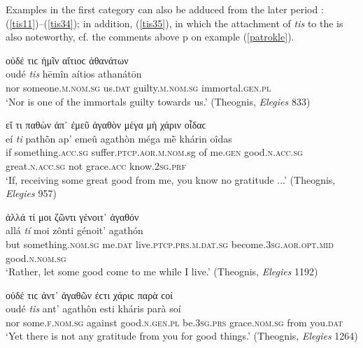 Examples in the first category can also be adduced from the later period \citep[572, note 6]{Kuehner1870}: (\ref{tis11})--(\ref{tis34}); in addition, (\ref{tis35}), in which the attachment of \textit{tis} to the  is also noteworthy, cf. the comments above p\pageref{patrokle} on example (\ref{patrokle}).

\begin{exe}
\ex οὐδέ τιϲ ἡμῖν αἴτιοϲ ἀθανάτων\\
\gll oudé \emph{tis} hēmîn aítios athanátōn\\
nor someone.\textsc{m.nom.sg} us.\textsc{dat} guilty.\textsc{m.nom.sg}
immortal.\textsc{gen.pl}\\
\trans `Nor is one of the immortals guilty towards us.' (Theognis, \textit{Elegies} 833)
\label{tis11}
\end{exe}

\begin{exe}
\ex εἴ τι παθὼν ἀπ᾽ ἐμεῦ ἀγαθὸν μέγα μὴ χάριν οἶδαϲ\\
\gll eí \emph{ti} pathṑn ap' emeû agathòn méga mḕ khárin oîdas\\
if something.\textsc{acc.sg} suffer.\textsc{ptcp.aor.m.nom.}sg of me.\textsc{gen} good.\textsc{n.acc.sg} great.\textsc{n.acc.sg} not grace.\textsc{acc} know.\textsc{2sg.prf}\\
\trans `If, receiving some great good from me, you know no gratitude ...' (Theognis, \textit{Elegies} 957)
\label{tis12}
\end{exe}

\begin{exe}
\ex ἀλλά τί μοι ζῶντι γένοιτ᾽ ἀγαθόν\\
\gll allá \emph{tí} moi zônti génoit' agathón\\
but something.\textsc{nom.sg} me.\textsc{dat} live.\textsc{ptcp.prs.m.dat.sg} become.\textsc{3sg.aor.opt.mid} good.\textsc{n.nom.sg}\\
\trans `Rather, let some good come to me while I live.' (Theognis, \textit{Elegies} 1192)
\label{tis13}
\end{exe}

\begin{exe}
\ex οὐδέ τιϲ ἀντ᾽ ἀγαθῶν ἐϲτι χάριϲ παρὰ ϲοί\\
\gll oudé \emph{tis} ant' agathôn esti kháris parà soí\\
nor some.\textsc{f.nom.sg} against good.\textsc{n.gen.pl} be.\textsc{3sg.prs} grace.\textsc{nom.sg} from you.\textsc{dat}\\
\trans `Yet there is not any gratitude from you for good things.' (Theognis, \textit{Elegies} 1264)
\label{tis14}
\end{exe}

